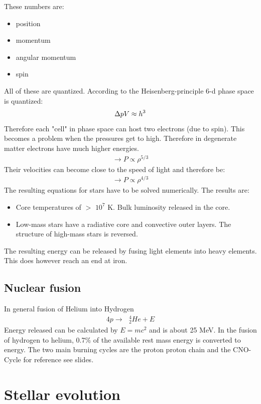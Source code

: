 \documentclass[11pt,a4paper]{article}
\begin{document}
These numbers are: 
\begin{itemize}
    \item position 
    \item momentum 
    \item angular momentum 
    \item spin
\end{itemize}
All of these are quantized. 
According to the Heisenberg-principle 6-d phase space is quantized: 
\begin{align*}
   \Delta p \time \Delta V \approx h^3 
\end{align*}
Therefore each "cell" in phase space can host two electrons (due to spin). 
This becomes a problem when the pressures get to high. 
Therefore in degenerate matter electrons have much higher energies. 
\begin{align*}
    \rightarrow P \propto \rho^{5/3} 
\end{align*}
Their velocities can become close to the speed of light and therefore be:
\begin{align*}
    \rightarrow P \propto \rho^{4/3} 
\end{align*}
The resulting equations for stars have to be solved numerically. 
The results are: 
\begin{itemize}
    \item Core temperatures of $>$ $10^7$ K. Bulk luminosity
released in the core. 
    \item Low-mass
stars have a radiative core and convective outer layers. The structure
of high-mass stars is reversed.
\end{itemize}
The resulting energy can be released by fusing light elements into heavy elements. 
This does however reach an end at iron.
\subsection{Nuclear fusion}
In general fusion of Helium into Hydrogen 
\begin{align*}
    4p \rightarrow \text{ }^4_2 He + E
\end{align*}
Energy released can be calculated by $E=mc^2$ 
and is about 25 MeV. 
In the fusion of hydrogen to helium, 0.7\% of the available rest mass energy is converted to energy.
The two main burning cycles are the proton proton chain and the CNO-Cycle
for reference see slides.
\section{Stellar evolution}
\end{document}
